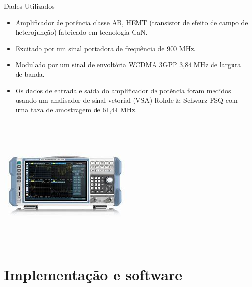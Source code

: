 \documentclass{if-beamer}
\begin{document}
\begin{frame}{Dados Utilizados}
	\begin{minipage}{0.5\textwidth}
		
		
	\end{minipage}%
	\hspace{0.04\textwidth}
	\begin{minipage}{0.5\textwidth}
		\begin{itemize}
			\item Amplificador de potência classe AB, HEMT (transistor de efeito de campo de heterojunção) fabricado em tecnologia GaN.
			\item Excitado por um sinal portadora de frequência de 900	MHz.
			\item Modulado por um sinal de envoltória WCDMA 3GPP 3,84 MHz de largura de banda.
			\item Os dados de entrada e saída do amplificador de potência foram medidos usando um analisador de sinal vetorial (VSA) Rohde \& Schwarz FSQ com uma taxa de amostragem de 61,44 MHz.
		\end{itemize}
	\end{minipage}
	\begin{minipage}{0.5\textwidth}
		
		\includegraphics[scale=0.4]{analisador.jpeg}
		
	\end{minipage}%
\end{frame}

\section{Implementação e software}
\end{document}
